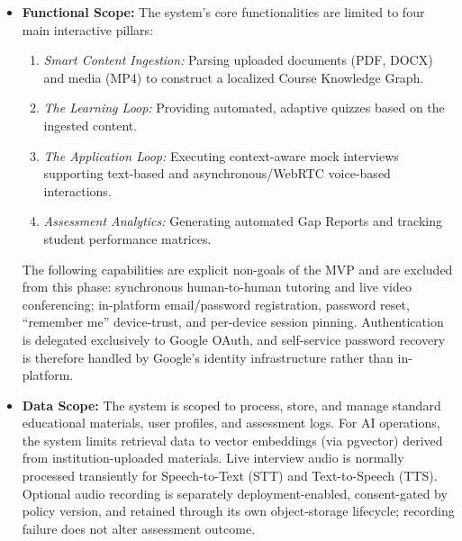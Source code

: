 \begin{itemize}
    \item \textbf{Functional Scope:} The system's core functionalities are limited to four main interactive pillars: 
    \begin{enumerate}
        \item \textit{Smart Content Ingestion:} Parsing uploaded documents (PDF, DOCX) and media (MP4) to construct a localized Course Knowledge Graph.
        \item \textit{The Learning Loop:} Providing automated, adaptive quizzes based on the ingested content.
        \item \textit{The Application Loop:} Executing context-aware mock interviews supporting text-based and asynchronous/WebRTC voice-based interactions.
        \item \textit{Assessment Analytics:} Generating automated Gap Reports and tracking student performance matrices.
    \end{enumerate}
    The following capabilities are explicit non-goals of the MVP and are excluded from this phase: synchronous human-to-human tutoring and live video conferencing; in-platform email/password registration, password reset, ``remember me'' device-trust, and per-device session pinning. Authentication is delegated exclusively to Google OAuth, and self-service password recovery is therefore handled by Google's identity infrastructure rather than in-platform.
    
    \item \textbf{Data Scope:} The system is scoped to process, store, and manage standard educational materials, user profiles, and assessment logs. For AI operations, the system limits retrieval data to vector embeddings (via pgvector) derived from institution-uploaded materials. Live interview audio is normally processed transiently for Speech-to-Text (STT) and Text-to-Speech (TTS). Optional audio recording is separately deployment-enabled, consent-gated by policy version, and retained through its own object-storage lifecycle; recording failure does not alter assessment outcome.
\end{itemize}